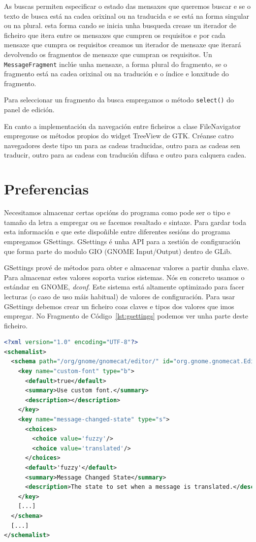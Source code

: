As buscas permiten especificar o estado das mensaxes que queremos buscar e se o texto de busca está na cadea orixinal ou na traducida e se está na forma singular ou na plural. esta forma cando se inicia unha busqueda crease un iterador de ficheiro que itera entre os mensaxes que cumpren os requisitos e por cada mensaxe que cumpra os requisitos creamos un iterador de mensaxe que iterará devolvendo os fragmentos de mensaxe que cumpran os requisitos. Un \lstinline{MessageFragment} inclúe unha mensaxe, a forma plural do fragmento, se o fragmento está na cadea orixinal ou na tradución e o índice e lonxitude do fragmento.

Para seleccionar un fragmento da busca empregamos o método \lstinline{select()} do panel de edición.

En canto a implementación da navegación entre ficheiros a clase FileNavigator empregouse os métodos propios do widget TreeView de GTK. Créanse catro navegadores deste tipo un para as cadeas traducidas, outro para as cadeas sen traducir, outro para as cadeas con tradución difusa e outro para calquera cadea.

\section{Preferencias}
Necesitamos almacenar certas opcións do programa como pode ser o tipo e tamaño da letra a empregar ou se facemos resaltado e sintaxe. Para gardar toda esta información e que este dispoñible entre diferentes sesións do programa empregamos GSettings. GSettings é unha API para a xestión de configuración que forma parte do modulo GIO (GNOME Input/Output) dentro de GLib.

GSettings prové de métodos para obter e almacenar valores a partir dunha clave. Para almacenar estes valores soporta varios sistemas. Nós en concreto usamos o estándar en GNOME, \emph{dconf}. Este sistema está altamente optimizado para facer lecturas (o caso de uso máis habitual) de valores de configuración. Para usar GSettings debemos crear un ficheiro coas claves e tipos dos valores que imos empregar. No Fragmento de Código~\ref{lst:gsettings} podemos ver unha parte deste ficheiro.

\begin{lstlisting}[language=XML,label=lst:gsettings,caption=Fragmento da dos esquemas creados de GSettings]
<?xml version="1.0" encoding="UTF-8"?>
<schemalist>
  <schema path="/org/gnome/gnomecat/editor/" id="org.gnome.gnomecat.Editor">
    <key name="custom-font" type="b">
      <default>true</default>
      <summary>Use custom font.</summary>
      <description></description>
    </key>
    <key name="message-changed-state" type="s">
      <choices>
        <choice value='fuzzy'/>
        <choice value='translated'/>
      </choices>
      <default>'fuzzy'</default>
      <summary>Message Changed State</summary>
      <description>The state to set when a message is translated.</description>
    </key>
    [...]
  </schema>
  [...]
</schemalist>
\end{lstlisting}

